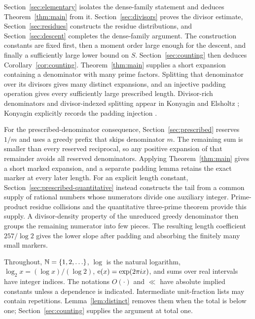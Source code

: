 Section~\ref{sec:elementary} isolates the dense-family statement and
deduces Theorem~\ref{thm:main} from it. Section~\ref{sec:divisors}
proves the divisor estimate, Section~\ref{sec:residues} constructs
the residue distributions, and Section~\ref{sec:descent} completes
the dense-family argument. The construction constants are fixed first,
then a moment order large enough for the descent, and finally a
sufficiently large lower bound on $S$.
Section~\ref{sec:counting} then deduces Corollary~\ref{cor:counting}.
Theorem~\ref{thm:main} supplies a short expansion containing a denominator
with many prime factors. Splitting that denominator over its divisors
gives many distinct expansions, and an injective padding operation gives
every sufficiently large prescribed length. Divisor-rich denominators
and divisor-indexed splitting appear in Konyagin and Elsholtz
\cite{Konyagin2014,Elsholtz2016}; Konyagin explicitly records the padding
injection \cite[p.~312]{Konyagin2014}.


For the prescribed-denominator consequence, Section~\ref{sec:prescribed}
reserves $1/m$ and uses a greedy prefix that skips denominator $m$.
The remaining sum is smaller than every reserved reciprocal, so any
positive expansion of that remainder avoids all reserved denominators.
Applying Theorem~\ref{thm:main} gives a short marked expansion, and a
separate padding lemma retains the exact marker at every later length.
For an explicit length constant, Section~\ref{sec:prescribed-quantitative}
instead constructs the tail from a common supply of rational numbers
whose numerators divide one auxiliary integer. Prime-product residue
collisions and the quantitative three-prime theorem provide this supply.
A divisor-density property of the unreduced greedy denominator then
groups the remaining numerator into few pieces. The resulting length
coefficient $257/\log2$ gives the lower slope after padding and absorbing
the finitely many small markers.

Throughout, $\mathbb N=\{1,2,\ldots\}$, $\log$ is the natural logarithm, $\log_2 x=(\log x)/(\log 2)$,
$\mathrm e(x)=\exp(2\pi i x)$, and sums over real intervals have integer
indices. The notations $O(\cdot)$ and $\ll$ have absolute implied
constants unless a dependence is indicated. Intermediate unit-fraction
lists may contain repetitions. Lemma~\ref{lem:distinct} removes them
when the total is below one; Section~\ref{sec:counting} supplies the
argument at total one.
